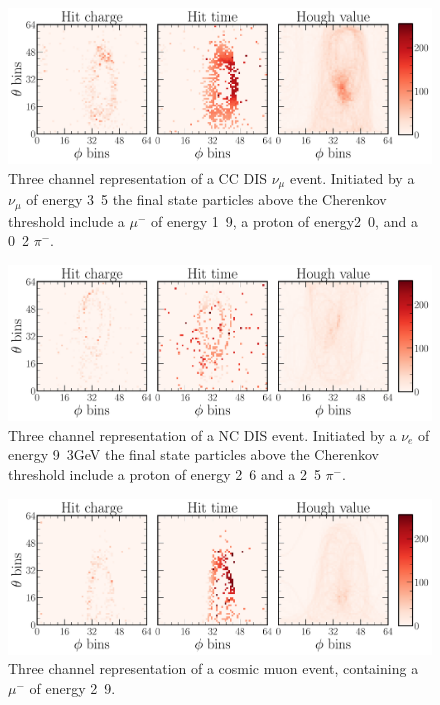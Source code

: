 \begin{figure} %
    \includegraphics[width=\textwidth]{diagrams/6-cvn/chipsnet/explore_numu_ccdis_event.pdf}
    \caption[Example of a CC DIS $\nu_{\mu}$ event.]
    {Three channel representation of a CC DIS $\nu_{\mu}$ event. Initiated by a $\nu_{\mu}$ of
        energy \unit{3.5}{\GeV} the final state particles above the Cherenkov threshold include a
        $\mu^{-}$ of energy \unit{1.9}{\GeV}, a proton of energy\unit{2.0}{\GeV}, and a
        \unit{0.2}{\GeV} $\pi^{-}$.}
    \label{fig:explore_numu_ccdis_event}
\end{figure}

\begin{figure} %
    \includegraphics[width=\textwidth]{diagrams/6-cvn/chipsnet/explore_nuel_ncdis_event.pdf}
    \caption[Example of a NC DIS event.]
    {Three channel representation of a NC DIS event. Initiated by a $\nu_{e}$ of energy
        \unit{9.3}{GeV} the final state particles above the Cherenkov threshold include a proton
        of energy \unit{2.6}{\GeV} and a \unit{2.5}{\GeV} $\pi^{-}$.}
    \label{fig:explore_nuel_ncdis_event}
\end{figure}

\begin{figure} %
    \includegraphics[width=\textwidth]{diagrams/6-cvn/chipsnet/explore_cosmic_event.pdf}
    \caption[Example of a cosmic muon event.]
    {Three channel representation of a cosmic muon event, containing a $\mu^{-}$ of energy
        \unit{2.9}{\GeV}.}
    \label{fig:explore_cosmic_event}
\end{figure}

